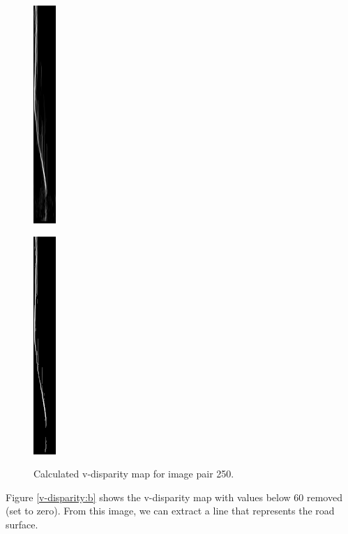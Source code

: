 \documentclass[a4paper,11pt]{article}
\begin{document}
\begin{figure}[H]
\centering
\begin{minipage}{0.32\linewidth}
\centering
\includegraphics[scale=0.5]{pic/v-disparity.png}
\label{v-disparity:a}
\end{minipage}
\begin{minipage}{0.32\linewidth}
\centering
\includegraphics[scale=0.5]{pic/v-disparity-threshold.png}
\label{v-disparity:b}
\end{minipage}
\caption{Calculated v-disparity map for image pair 250.}
\label{v-disparity}
\end{figure}

Figure \ref{v-disparity:b} shows the v-disparity map with values below 60 removed (set to zero). From this image, we can extract a line that represents the road surface.
\end{document}
